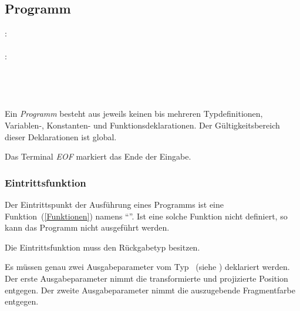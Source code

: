 \subsection{Programm}\label{Programm}
:\label{programm}\\
\hspace*{1cm}\Gspace{}\\
:\label{programm_statements}\\
\hspace*{1cm} \Gspace{}\\
\hspace*{1cm} \Gspace\Gt{;}\Gspace{}\\
\hspace*{1cm} \Gspace\Gt{;}\Gspace{}\\
\hspace*{1cm} \Gspace\Gt{;}\Gspace{}\\


Ein \emph{Programm} besteht aus jeweils keinen bis mehreren Typdefinitionen, Variablen-, Konstanten- und Funktionsdeklarationen.
Der Gültigkeitsbereich dieser Deklarationen ist global.

\label{EOF} Das Terminal \emph{EOF} markiert das Ende der Eingabe.


\subsubsection{{Eintrittsfunktion}}\label{__Eintrittsfunktion__}
Der Eintrittspunkt der Ausführung eines Programms ist eine Funktion~(\ref{Funktionen}) namens "`"'. Ist eine solche Funktion nicht definiert, so
kann das Programm nicht ausgeführt werden.

Die Eintrittsfunktion muss den Rückgabetyp  besitzen.

Es müssen genau zwei Ausgabeparameter vom Typ ~(siehe ) deklariert werden.
Der erste Ausgabeparameter nimmt die transformierte und projizierte Position entgegen.
Der zweite Ausgabeparameter nimmt die auszugebende Fragmentfarbe entgegen.

